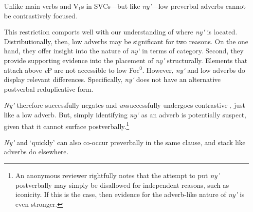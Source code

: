 \documentclass[output=paper]{../langsci/langscibook}
\begin{document}
Unlike main verbs and V$_1$s in SVCs---but like \textit{ny\'{\textturnv}\ng}---low preverbal adverbs cannot be contrastively focused.

\label{ex:duncan-et-al:20}
\z

\noindent This restriction comports well with our understanding of where \textit{ny\'{\textturnv}\ng} is located. Distributionally, then, low adverbs may be significant for two reasons. On the one hand, they offer insight into the nature of \textit{ny\'{\textturnv}\ng} in terms of category. Second, they provide supporting evidence into the placement of \textit{ny\'{\textturnv}\ng} structurally. Elements that attach above \textit{v}P are not accessible to low Foc$^0$. However, \textit{ny\'{\textturnv}\ng} and low adverbs do display relevant differences. Specifically, \textit{ny\'{\textturnv}\ng} does not have an alternative postverbal reduplicative form.

\label{ex:duncan-et-al:21}
\z

\noindent \textit{Ny\'{\textturnv}\ng} therefore successfully negates and \textit{un}successfully undergoes contrastive , just like a low adverb. But, simply identifying \textit{ny\'{\textturnv}\ng} as an adverb is potentially suspect, given that it cannot surface postverbally.\footnote{An anonymous reviewer rightfully notes that the attempt to put \textit{ny\'{\textturnv}\ng} postverbally may simply be disallowed for independent reasons, such as iconicity. If this is the case, then evidence for the adverb-like nature of \textit{ny\'{\textturnv}\ng} is even stronger.}

\textit{Ny\'{\textturnv}\ng} and `quickly' can also co-occur preverbally in the same clause, and stack like adverbs do elsewhere.

\ea\label{ex:duncan-et-al:22}
\z
\z
\end{document}
